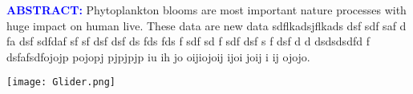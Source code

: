 \documentclass[../Main.tex]{subfiles}
\begin{document}
\begin{minipage}[t]{0.6\textwidth}
 \begin{tcolorbox}[colback=light-orange, boxrule=0pt]
    \textcolor{blue}{\textbf{ABSTRACT:}} Phytoplankton blooms are most important nature processes with huge impact on human live. These data are new data sdflkadsjflkads dsf sdf saf d fa dsf sdfdaf sf sf dsf dsf ds fds fds f sdf sd f sdf dsf s f dsf d d  dsdsdsdfd f dsfafsdfojojp pojopj pjpjpjp  iu ih jo oijiojoij  ijoi joij i ij ojojo.
  \end{tcolorbox}
\end{minipage}

\begin{minipage}[t]{0.3\textwidth}
    \texttt{[image: Glider.png]}
  \end{minipage}
\end{document}
